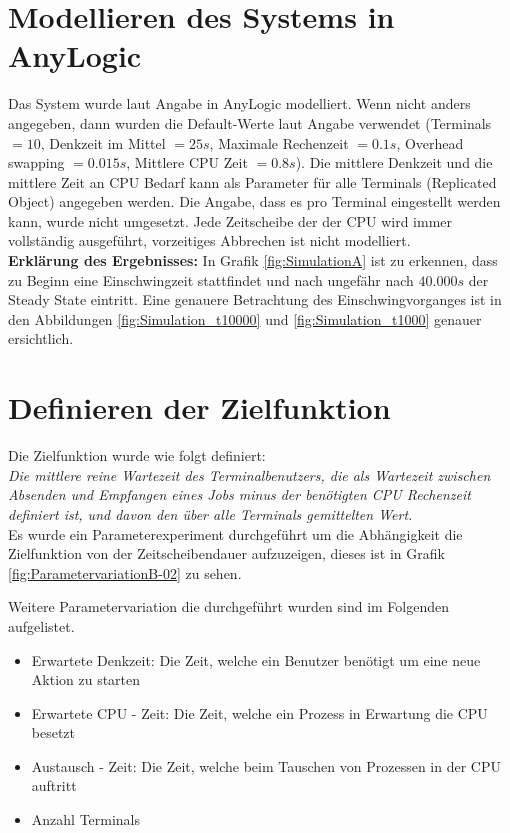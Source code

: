 \documentclass[
a4paper,   
headsepline, 
fleqn,     
11pt
]{scrartcl}
\begin{document}

\section{Modellieren des Systems in AnyLogic}
Das System wurde laut Angabe in AnyLogic modelliert. Wenn nicht anders angegeben, dann wurden die Default-Werte laut Angabe verwendet (Terminals $=10$, Denkzeit im Mittel $=25s$, Maximale Rechenzeit $=0.1s$, Overhead swapping $=0.015s$, Mittlere CPU Zeit $=0.8s$).
Die mittlere Denkzeit und die mittlere Zeit an CPU Bedarf kann als Parameter für alle Terminals (Replicated Object) angegeben werden. Die Angabe, dass es pro Terminal eingestellt werden kann, wurde nicht umgesetzt. Jede Zeitscheibe der der CPU wird immer vollständig ausgeführt, vorzeitiges Abbrechen ist nicht modelliert. \\

\textbf{Erklärung des Ergebnisses:} In Grafik \ref{fig:SimulationA} ist zu erkennen, dass zu Beginn eine Einschwingzeit stattfindet und nach ungefähr nach $40.000s$ der Steady State eintritt. Eine genauere Betrachtung des Einschwingvorganges ist in den Abbildungen \ref{fig:Simulation_t10000} und \ref{fig:Simulation_t1000} genauer ersichtlich.

\section{Definieren der Zielfunktion}
\label{sec:DefinitionTargetFunction}
Die Zielfunktion wurde wie folgt definiert: \\
\textit{Die mittlere reine Wartezeit des Terminalbenutzers, die als Wartezeit zwischen Absenden und Empfangen eines Jobs minus der benötigten CPU Rechenzeit definiert ist, und davon den über alle Terminals gemittelten Wert.} \\

Es wurde ein Parameterexperiment durchgeführt um die Abhängigkeit die Zielfunktion von der Zeitscheibendauer aufzuzeigen, dieses ist in Grafik \ref{fig:ParametervariationB-02} zu sehen.

Weitere Parametervariation die durchgeführt wurden sind im Folgenden aufgelistet.

\begin{itemize}
	\item Erwartete Denkzeit: Die Zeit, welche ein Benutzer benötigt um eine neue Aktion zu starten
	\item Erwartete CPU - Zeit: Die Zeit, welche ein Prozess in Erwartung die CPU besetzt
	\item Austausch - Zeit: Die Zeit, welche beim Tauschen von Prozessen in der CPU auftritt
	\item Anzahl Terminals
\end{itemize}
\end{document}
